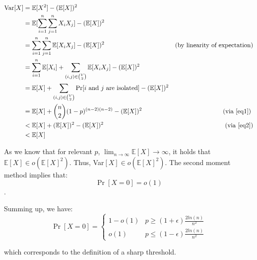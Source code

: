 \documentclass[a4paper,german]{article}
\begin{document}
\begin{enumerate}
\begin{align*}
\text{Var}[X] &= \mathbb{E}[X^2] - (\mathbb{E}[X])^2\\
&= \mathbb{E}[\sum_{i=1}^n \sum_{j = 1}^n X_i X_j] - (\mathbb{E}[X])^2\\
&= \sum_{i=1}^n \sum_{j = 1}^n \mathbb{E}[X_i X_j]  - (\mathbb{E}[X])^2 & \text{(by linearity of expectation)}\\
&= \sum_{i=1}^n \mathbb{E}[X_i] + \sum_{(i,j) \in {{V} \choose{2}}} \mathbb{E}[X_i X_j]  - (\mathbb{E}[X])^2 \\
&= \mathbb{E}[X] +   \sum_{(i,j) \in {{V} \choose{2}}} \Pr[i \text{ and } j \text{ are isolated}] - (\mathbb{E}[X])^2 \\
&= \mathbb{E}[X] + {{n} \choose {2}}   (1-p)^{(n-2)(n-2) } - (\mathbb{E}[X])^2 &  \text{(via \ref{eq1}) } \\
&< \mathbb{E}[X] +  (\mathbb{E}[X])^2   - (\mathbb{E}[X])^2 & \text{(via \ref{eq2})} \\
&< \mathbb{E}[X]
\end{align*}

As we know that for relevant \(p\), \(\lim_{n \to \infty} \mathbb{E}[X] \to \infty\), it holds that \(\mathbb{E}[X] \in o (\mathbb{E}[X]^2) \). Thus, Var\([X] \in o (\mathbb{E}[X]^2) \). The second moment method implies that:
$$ \Pr[X=0] = o(1) $$.

\end{enumerate}

Summing up, we have:
\[
    \Pr[X=0] = 
\begin{cases}
   1 - o(1) & p \geq (1+\epsilon)\frac{2ln(n)}{n^2}\\
   o(1)             & p \leq (1- \epsilon)\frac{2ln(n)}{n^2}
\end{cases}
\]

which corresponds to the definition of a sharp threshold.
\end{document}
